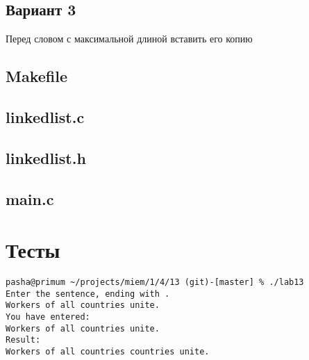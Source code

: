 \documentclass[a4paper,12pt,fleqn,twoside]{scrartcl}
\begin{document}
\subsection*{Вариант 3}
Перед словом с максимальной длиной вставить его копию

\subsection*{Makefile}


\subsection*{linkedlist.c}


\subsection*{linkedlist.h}

\subsection{main.c}

\section*{Тесты}
\small
\begin{verbatim}
pasha@primum ~/projects/miem/1/4/13 (git)-[master] % ./lab13
Enter the sentence, ending with .
Workers of all countries unite.
You have entered:
Workers of all countries unite.
Result:
Workers of all countries countries unite.

\end{verbatim}

\end{document}
